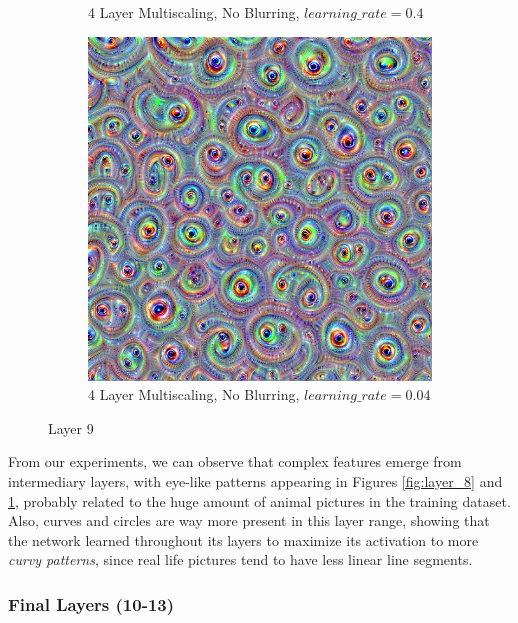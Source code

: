 \begin{figure}
\begin{subfigure}[t]{0.31\textwidth}
        \caption{4 Layer Multiscaling, No Blurring, \(learning\_rate = 0.4\)}
    \end{subfigure}
    \hfill
    \begin{subfigure}[t]{0.31\textwidth}
        \captionsetup{justification=centering}
        \centering
        \includegraphics[width=.7\linewidth]{figuras/feat_vis/experiments/layers/intermediary/l9/random_image_pl4_lr4e-2_layer19_no-blur.png}
        \caption{4 Layer Multiscaling, No Blurring, \(learning\_rate = 0.04\)}
    \end{subfigure}
    
    \caption{Layer 9}
    \label{fig:layer_9}
    
\end{figure}

From our experiments, we can observe that complex features emerge from intermediary layers, with eye-like patterns appearing in Figures \ref{fig:layer_8} and \ref{fig:layer_9}, probably related to the huge amount of animal pictures in the training dataset.
Also, curves and circles are way more present in this layer range, showing that the network learned throughout its layers to maximize its activation to more \emph{curvy patterns}, since real life pictures tend to have less linear line segments. 

\subsubsection{Final Layers (10-13)}

